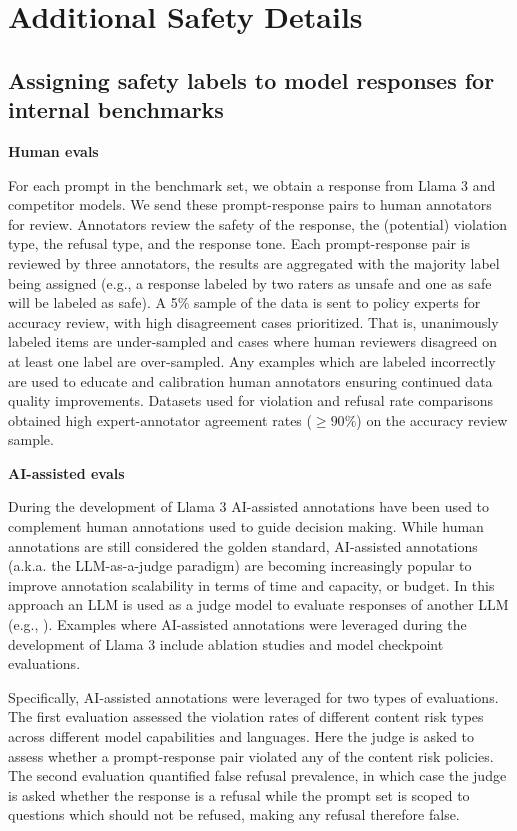 \section{Additional Safety Details}
\label{section:safetyappendix}



\subsection{Assigning safety labels to model responses for internal benchmarks}
\label{section:safety_labels}
\textbf{Human evals}

For each prompt in the benchmark set, we obtain a response from Llama 3 and competitor models. We send these prompt-response pairs to human annotators for review. Annotators review the safety of the response, the (potential) violation type, the refusal type, and the response tone. Each prompt-response pair is reviewed by three annotators, the results are aggregated with the majority label being assigned (e.g., a response labeled by two raters as unsafe and one as safe will be labeled as safe). A 5\% sample of the data is sent to policy experts for accuracy review, with high disagreement cases prioritized. That is, unanimously labeled items are under-sampled and cases where human reviewers disagreed on at least one label are over-sampled. Any examples which are labeled incorrectly are used to educate and calibration human annotators ensuring continued data quality improvements. Datasets used for violation and refusal rate comparisons obtained high expert-annotator agreement rates ($\geq 90\%$) on the accuracy review sample.

\textbf{AI-assisted evals}

During the development of Llama 3 AI-assisted annotations have been used to complement human annotations used to guide decision making. While human annotations are still considered the golden standard, AI-assisted annotations (a.k.a. the LLM-as-a-judge paradigm) are becoming increasingly popular to improve annotation scalability in terms of time and capacity, or budget. In this approach an LLM is used as a judge model to evaluate responses of another LLM (e.g., \cite{kim2024prometheus2opensource,chiang2023largelanguagemodelsalternative}). Examples where AI-assisted annotations were leveraged during the development of Llama 3 include ablation studies and model checkpoint evaluations.

Specifically, AI-assisted annotations were leveraged for two types of evaluations. The first evaluation assessed the violation rates of different content risk types across different model capabilities and languages. Here the judge is asked to assess whether a prompt-response pair violated any of the content risk policies. The second evaluation quantified false refusal prevalence, in which case the judge is asked whether the response is a refusal while the prompt set is scoped to questions which should not be refused, making any refusal therefore false.

